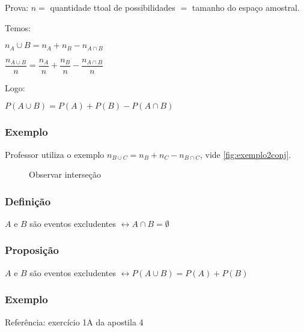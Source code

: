 \documentclass[a4paper]{article}
\begin{document}
	Prova: $n =$ quantidade ttoal de possibilidades $=$ tamanho do espaço amostral.
	
	Temos:
	
	$n_A\cup B = n_A + n_B - n_{A \cap B}$
	
	$\dfrac{n_{A\cup B}}{n} = \dfrac{n_{A}}{n} + \dfrac{n_B}{n} - \dfrac{n_{A \cap B}}{n}$

	Logo:
	
	$P(A \cup B) = P(A) + P(B) - P(A \cap B)$
	
	\subsubsection{Exemplo}
	
	Professor utiliza o exemplo $n_{B \cup C} = n_{B} + n_{C} - n_{B \cap C}$, vide \autoref{fig:exemplo2conj}.
	
	\begin{figure}[h]
	\centering
		\caption{Observar interseção}
		\label{fig:exemplo2conj}
	\end{figure}
	
	\subsubsection{Definição}
	
	$A$ e $B$ são eventos excludentes \hspace{5mm} $\leftrightarrow A \cap B = \emptyset$
	
	\subsubsection{Proposição}
	
	$A$ e $B$ são eventos excludentes \hspace{5mm} $\leftrightarrow P(A \cup B) = P(A) + P(B)$
	
	\subsubsection{Exemplo}
	
	Referência: exercício 1A da apostila 4
	
\end{document}
